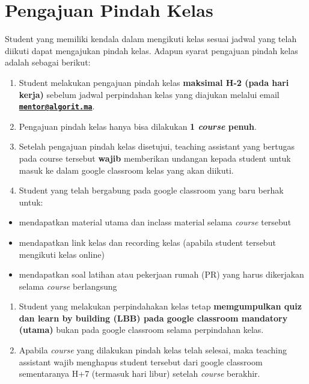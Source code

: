 \documentclass[
]{book}
\providecommand{\tightlist}{%
  \setlength{\itemsep}{0pt}\setlength{\parskip}{0pt}}
\begin{document}
\hypertarget{pengajuan-pindah-kelas}{%
\section{Pengajuan Pindah Kelas}\label{pengajuan-pindah-kelas}}

Student yang memiliki kendala dalam mengikuti kelas sesuai jadwal yang telah diikuti dapat mengajukan pindah kelas. Adapun syarat pengajuan pindah kelas adalah sebagai berikut:

\begin{enumerate}
\def\labelenumi{\arabic{enumi}.}
\tightlist
\item
  Student melakukan pengajuan pindah kelas \textbf{maksimal H-2 (pada hari kerja)} sebelum jadwal perpindahan kelas yang diajukan melalui email \textbf{\href{mailto:mentor@algorit.ma}{\nolinkurl{mentor@algorit.ma}}}.
\item
  Pengajuan pindah kelas hanya bisa dilakukan \textbf{1 \emph{course} penuh}.
\item
  Setelah pengajuan pindah kelas disetujui, teaching assistant yang bertugas pada course tersebut \textbf{wajib} memberikan undangan kepada student untuk masuk ke dalam google classroom kelas yang akan diikuti.
\item
  Student yang telah bergabung pada google classroom yang baru berhak untuk:
\end{enumerate}

\begin{itemize}
\tightlist
\item
  mendapatkan material utama dan inclass material selama \emph{course} tersebut
\item
  mendapatkan link kelas dan recording kelas (apabila student tersebut mengikuti kelas online)
\item
  mendapatkan soal latihan atau pekerjaan rumah (PR) yang harus dikerjakan selama \emph{course} berlangsung
\end{itemize}

\begin{enumerate}
\def\labelenumi{\arabic{enumi}.}
\setcounter{enumi}{4}
\tightlist
\item
  Student yang melakukan perpindahakan kelas tetap \textbf{memgumpulkan quiz dan learn by building (LBB) pada google classroom mandatory (utama)} bukan pada google classroom selama perpindahan kelas.
\item
  Apabila \emph{course} yang dilakukan pindah kelas telah selesai, maka teaching assistant wajib menghapus student tersebut dari google classroom sementaranya H+7 (termasuk hari libur) setelah \emph{course} berakhir.
\end{enumerate}
\end{document}
